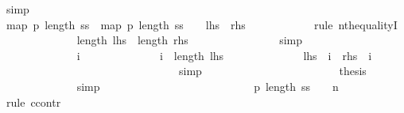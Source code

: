 \begin{isabellebody}
\ simp\isanewline
\ \ \ \ \ \ \ \ \ \ \ \ \isamarkupfalse%
\isanewline
\ \ \ \ \ \ \ \ \ \ \isamarkupfalse%
\isanewline
\ \ \ \ \ \ \ \ \ \ \isamarkupfalse%
\ {\isachardoublequoteopen}map\ {\isacharquery}p{}\ {\isacharbrackleft}{}{\isachardot}{\isachardot}{\isacharless}length\ ss{\isacharbrackright}\ {\isacharequal}\ map\ {\isacharquery}p{}\ {\isacharbrackleft}{}{\isachardot}{\isachardot}{\isacharless}length\ ss\ {\isacharminus}\ {}{\isacharbrackright}{\isachardoublequoteclose}\ {\isacharparenleft}\ {\isachardoublequoteopen}{\isacharquery}lhs\ {\isacharequal}\ {\isacharquery}rhs{\isachardoublequoteclose}{\isacharparenright}\isanewline
\ \ \ \ \ \ \ \ \ \ \isamarkupfalse%
\ {\isacharparenleft}rule\ nth{\isacharunderscore}equalityI{\isacharparenright}\isanewline
\ \ \ \ \ \ \ \ \ \ \ \ \isamarkupfalse%
\ {\isachardoublequoteopen}length\ {\isacharquery}lhs\ {\isacharequal}\ length\ {\isacharquery}rhs{\isachardoublequoteclose}\isanewline
\ \ \ \ \ \ \ \ \ \ \ \ \ \ \isamarkupfalse%
\ simp\isanewline
\ \ \ \ \ \ \ \ \ \ \isamarkupfalse%
\isanewline
\ \ \ \ \ \ \ \ \ \ \ \ \isamarkupfalse%
\ i\isanewline
\ \ \ \ \ \ \ \ \ \ \ \ \isamarkupfalse%
\ {\isachardoublequoteopen}i\ {\isacharless}\ length\ {\isacharquery}lhs{\isachardoublequoteclose}\isanewline
\ \ \ \ \ \ \ \ \ \ \ \ \isamarkupfalse%
\ {\isachardoublequoteopen}{\isacharquery}lhs\ {\isacharbang}\ i\ {\isacharequal}\ {\isacharquery}rhs\ {\isacharbang}\ i{\isachardoublequoteclose}\isanewline
\ \ \ \ \ \ \ \ \ \ \ \ \ \ \isamarkupfalse%
\ {\isacharasterisk}\isanewline
\ \ \ \ \ \ \ \ \ \ \ \ \ \ \isamarkupfalse%
\ simp\isanewline
\ \ \ \ \ \ \ \ \ \ \isamarkupfalse%
\isanewline
\ \ \ \ \ \ \ \ \ \ \isamarkupfalse%
\ \isamarkupfalse%
\ {\isacharquery}thesis\isanewline
\ \ \ \ \ \ \ \ \ \ \ \ \isamarkupfalse%
\ simp\isanewline
\ \ \ \ \ \ \ \ \isamarkupfalse%
\isanewline
\ \ \ \ \ \ \ \ \isamarkupfalse%
\isanewline
\ \ \ \ \ \ \ \ \isamarkupfalse%
\ {\isachardoublequoteopen}{\isacharquery}p{}\ {\isacharparenleft}length\ ss\ {\isacharminus}\ {}{\isacharparenright}\ {\isacharequal}\ n{\isachardoublequoteclose}\isanewline
\ \ \ \ \ \ \ \ \isamarkupfalse%
\ {\isacharparenleft}rule\ ccontr{\isacharparenright}\isanewline

\end{isabellebody}
